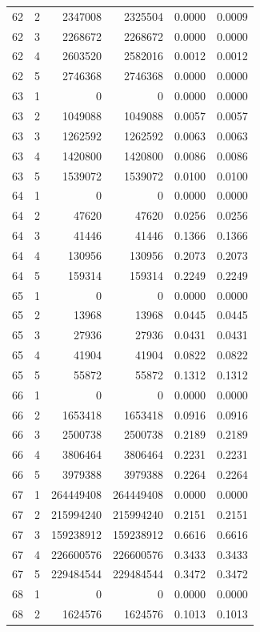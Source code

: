 \begin{longtable}{rrrrrr}
62 & 2 & 2347008 & 2325504 & 0.0000 & 0.0009 \\
62 & 3 & 2268672 & 2268672 & 0.0000 & 0.0000 \\
62 & 4 & 2603520 & 2582016 & 0.0012 & 0.0012 \\
62 & 5 & 2746368 & 2746368 & 0.0000 & 0.0000 \\
63 & 1 & 0 & 0 & 0.0000 & 0.0000 \\
63 & 2 & 1049088 & 1049088 & 0.0057 & 0.0057 \\
63 & 3 & 1262592 & 1262592 & 0.0063 & 0.0063 \\
63 & 4 & 1420800 & 1420800 & 0.0086 & 0.0086 \\
63 & 5 & 1539072 & 1539072 & 0.0100 & 0.0100 \\
64 & 1 & 0 & 0 & 0.0000 & 0.0000 \\
64 & 2 & 47620 & 47620 & 0.0256 & 0.0256 \\
64 & 3 & 41446 & 41446 & 0.1366 & 0.1366 \\
64 & 4 & 130956 & 130956 & 0.2073 & 0.2073 \\
64 & 5 & 159314 & 159314 & 0.2249 & 0.2249 \\
65 & 1 & 0 & 0 & 0.0000 & 0.0000 \\
65 & 2 & 13968 & 13968 & 0.0445 & 0.0445 \\
65 & 3 & 27936 & 27936 & 0.0431 & 0.0431 \\
65 & 4 & 41904 & 41904 & 0.0822 & 0.0822 \\
65 & 5 & 55872 & 55872 & 0.1312 & 0.1312 \\
66 & 1 & 0 & 0 & 0.0000 & 0.0000 \\
66 & 2 & 1653418 & 1653418 & 0.0916 & 0.0916 \\
66 & 3 & 2500738 & 2500738 & 0.2189 & 0.2189 \\
66 & 4 & 3806464 & 3806464 & 0.2231 & 0.2231 \\
66 & 5 & 3979388 & 3979388 & 0.2264 & 0.2264 \\
67 & 1 & 264449408 & 264449408 & 0.0000 & 0.0000 \\
67 & 2 & 215994240 & 215994240 & 0.2151 & 0.2151 \\
67 & 3 & 159238912 & 159238912 & 0.6616 & 0.6616 \\
67 & 4 & 226600576 & 226600576 & 0.3433 & 0.3433 \\
67 & 5 & 229484544 & 229484544 & 0.3472 & 0.3472 \\
68 & 1 & 0 & 0 & 0.0000 & 0.0000 \\
68 & 2 & 1624576 & 1624576 & 0.1013 & 0.1013 \\

\end{longtable}
